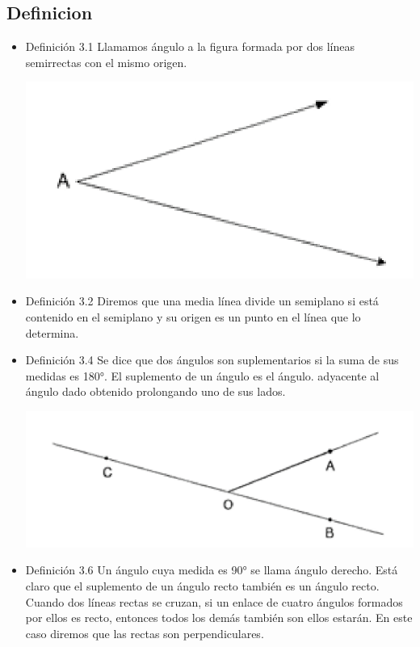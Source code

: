 \documentclass[12pt a4paper]{article}
\begin{document}
\subsection{Definicion}
\begin{itemize}
    \item Definición 3.1 Llamamos ángulo a la figura formada por dos
líneas semirrectas con el mismo origen.
\begin{center}
    \includegraphics[scale=0.8]{p.png}
\end{center}
    \item Definición 3.2 Diremos que una media línea divide un semiplano
si está contenido en el semiplano y su origen es un punto en el
línea que lo determina.
    \item Definición 3.4 Se dice que dos ángulos son suplementarios si la suma
de sus medidas es 180°. El suplemento de un ángulo es el ángulo.
adyacente al ángulo dado obtenido prolongando uno de sus
lados.
\begin{center}
    \includegraphics[scale=0.8]{r.png}
\end{center}
    \item Definición 3.6 Un ángulo cuya medida es 90° se llama ángulo
derecho. Está claro que el suplemento de un ángulo recto también es un
ángulo recto. Cuando dos líneas rectas se cruzan, si un enlace de cuatro
ángulos formados por ellos es recto, entonces todos los demás también son
ellos estarán. En este caso diremos que las rectas son perpendiculares.

\end{itemize}
\end{document}
